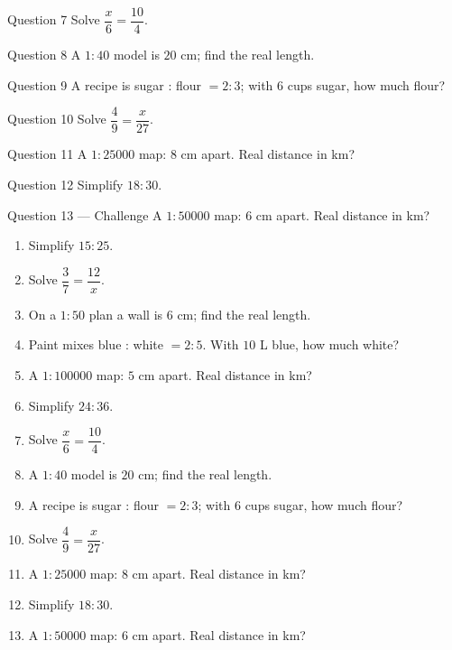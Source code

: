 \documentclass[11pt]{article}
\begin{document}
\begin{qbox}{Question 7}
Solve $\dfrac{x}{6}=\dfrac{10}{4}$.\workspace{2.0cm}
\end{qbox}

\begin{qbox}{Question 8}
A $1:40$ model is $20$ cm; find the real length.\workspace{2.0cm}
\end{qbox}

\begin{qbox}{Question 9}
A recipe is sugar : flour $=2:3$; with $6$ cups sugar, how much flour?\workspace{2.2cm}
\end{qbox}

\begin{qbox}{Question 10}
Solve $\dfrac{4}{9}=\dfrac{x}{27}$.\workspace{2.0cm}
\end{qbox}

\begin{qbox}{Question 11}
A $1:25000$ map: $8$ cm apart. Real distance in km?\workspace{2.2cm}
\end{qbox}

\begin{qbox}{Question 12}
Simplify $18:30$.\workspace{1.8cm}
\end{qbox}

\begin{qbox}{Question 13 --- Challenge}
A $1:50000$ map: $6$ cm apart. Real distance in km?\workspace{2.2cm}
\end{qbox}

\clearpage
{}

\begin{recapbox}
\begin{multicols}{2}
\small
\begin{enumerate}[leftmargin=*,itemsep=3pt]
  \item Simplify $15:25$.
  \item Solve $\dfrac{3}{7}=\dfrac{12}{x}$.
  \item On a $1:50$ plan a wall is $6$ cm; find the real length.
  \item Paint mixes blue : white $=2:5$. With $10$ L blue, how much white?
  \item A $1:100000$ map: $5$ cm apart. Real distance in km?
  \item Simplify $24:36$.
  \item Solve $\dfrac{x}{6}=\dfrac{10}{4}$.
  \item A $1:40$ model is $20$ cm; find the real length.
  \item A recipe is sugar : flour $=2:3$; with $6$ cups sugar, how much flour?
  \item Solve $\dfrac{4}{9}=\dfrac{x}{27}$.
  \item A $1:25000$ map: $8$ cm apart. Real distance in km?
  \item Simplify $18:30$.
  \item A $1:50000$ map: $6$ cm apart. Real distance in km?
\end{enumerate}
\end{multicols}
\end{recapbox}
\end{document}

